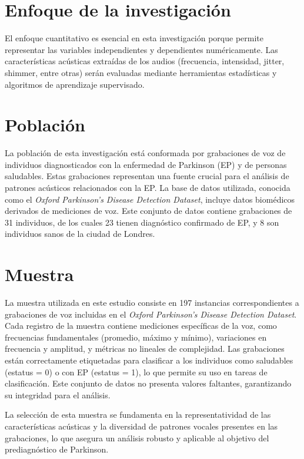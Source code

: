 \documentclass[listof=nochaptergap,12pt,times,authoryear]{report}
\begin{document}
\section{Enfoque de la investigación}

El enfoque cuantitativo es esencial en esta investigación porque permite representar las variables independientes y dependientes numéricamente. Las características acústicas extraídas de los audios (frecuencia, intensidad, jitter, shimmer, entre otras) serán evaluadas mediante herramientas estadísticas y algoritmos de aprendizaje supervisado.

\section{Población}
La población de esta investigación está conformada por grabaciones de voz de individuos diagnosticados con la enfermedad de Parkinson (EP) y de personas saludables. Estas grabaciones representan una fuente crucial para el análisis de patrones acústicos relacionados con la EP. La base de datos utilizada, conocida como el \textit{Oxford Parkinson's Disease Detection Dataset}, incluye datos biomédicos derivados de mediciones de voz. Este conjunto de datos contiene grabaciones de 31 individuos, de los cuales 23 tienen diagnóstico confirmado de EP, y 8 son individuos sanos de la ciudad de Londres.

\section{Muestra}
La muestra utilizada en este estudio consiste en 197 instancias correspondientes a grabaciones de voz incluidas en el \textit{Oxford Parkinson's Disease Detection Dataset}. Cada registro de la muestra contiene mediciones específicas de la voz, como frecuencias fundamentales (promedio, máximo y mínimo), variaciones en frecuencia y amplitud, y métricas no lineales de complejidad. Las grabaciones están correctamente etiquetadas para clasificar a los individuos como saludables (estatus = 0) o con EP (estatus = 1), lo que permite su uso en tareas de clasificación. Este conjunto de datos no presenta valores faltantes, garantizando su integridad para el análisis. 

La selección de esta muestra se fundamenta en la representatividad de las características acústicas y la diversidad de patrones vocales presentes en las grabaciones, lo que asegura un análisis robusto y aplicable al objetivo del prediagnóstico de Parkinson.
\end{document}
